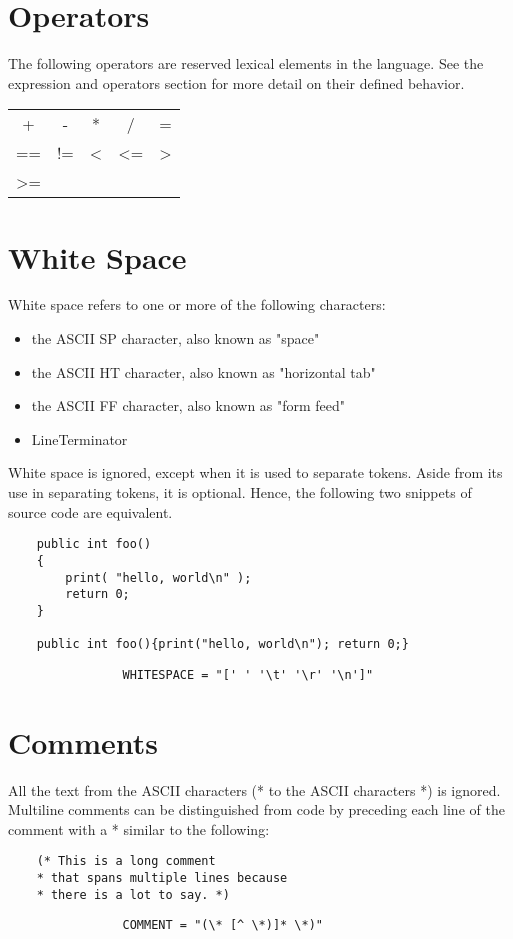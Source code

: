 \begin{homeworkProblem}
	\section{Operators}
	The following operators are reserved lexical elements in the language. See the expression and operators section for more detail on their defined behavior.
	\begin{center}
		\begin{tabular}{ccccc}
			+ & - & * & / & = \\
			== & != & \textless & \textless= & \textgreater \\
			\textgreater= 
		\end{tabular}
	\end{center}
 	
	\section{White Space}
	White space refers to one or more of the following characters:
	\begin{itemize}
		\item the ASCII SP character, also known as "space"
		\item the ASCII HT character, also known as "horizontal tab"
		\item the ASCII FF character, also known as "form feed"
		\item LineTerminator
	\end{itemize}
	White space is ignored, except when it is used to separate tokens. Aside from its use in separating tokens, it is optional. Hence, the following two snippets of source code are equivalent.
	
	\begin{verbatim}
	public int foo()
	{
		print( "hello, world\n" );
		return 0;
	}
	
	public int foo(){print("hello, world\n"); return 0;}
	\end{verbatim}
	
	\begin{verbatim}
				WHITESPACE = "[' ' '\t' '\r' '\n']"
 	\end{verbatim}
	
	\section{Comments}
	All the text from the ASCII characters (* to the ASCII characters *) is ignored. Multiline comments can be distinguished from code by preceding each line of the comment with a * similar to the following:
	\begin{verbatim}
	(* This is a long comment 
	* that spans multiple lines because
	* there is a lot to say. *)
	\end{verbatim}

	\begin{verbatim}
				COMMENT = "(\* [^ \*)]* \*)"
	\end{verbatim}

\end{homeworkProblem}